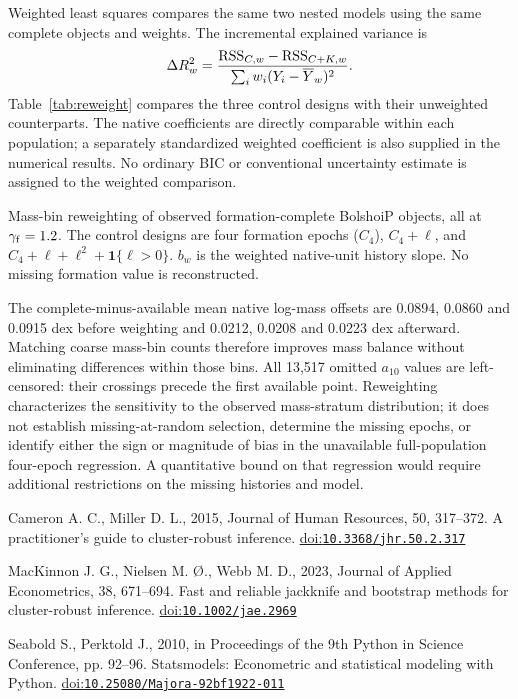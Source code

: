\documentclass[11pt,a4paper]{article}
\newcommand{\doi}[1]{\href{https://doi.org/#1}{doi:\nolinkurl{#1}}}
\begin{document}
Weighted least squares compares the same two nested models using the same complete objects and weights. The incremental explained variance is
\begin{equation}
\Delta R^2_w=\frac{{\rm RSS}_{C,w}-{\rm RSS}_{C+K,w}}{\sum_iw_i(Y_i-\overline Y_w)^2}.
\end{equation}
Table~\ref{tab:reweight} compares the three control designs with their unweighted counterparts. The native coefficients are directly comparable within each population; a separately standardized weighted coefficient is also supplied in the numerical results. No ordinary BIC or conventional uncertainty estimate is assigned to the weighted comparison.
\begin{table}[htbp]\centering\small

\caption{Mass-bin reweighting of observed formation-complete BolshoiP objects, all at $\gamma_{\rm f}=1.2$. The control designs are four formation epochs ($C_4$), $C_4+\ell$, and $C_4+\ell+\ell^2+\mathbf1\{\ell>0\}$. $b_w$ is the weighted native-unit history slope. No missing formation value is reconstructed.}\label{tab:reweight}
\end{table}

The complete-minus-available mean native log-mass offsets are 0.0894, 0.0860 and 0.0915 dex before weighting and 0.0212, 0.0208 and 0.0223 dex afterward. Matching coarse mass-bin counts therefore improves mass balance without eliminating differences within those bins. All 13,517 omitted $a_{10}$ values are left-censored: their crossings precede the first available point. Reweighting characterizes the sensitivity to the observed mass-stratum distribution; it does not establish missing-at-random selection, determine the missing epochs, or identify either the sign or magnitude of bias in the unavailable full-population four-epoch regression. A quantitative bound on that regression would require additional restrictions on the missing histories and model.

{\small
\begin{thebibliography}{9}
Cameron A. C., Miller D. L., 2015, Journal of Human Resources, 50, 317--372. A practitioner's guide to cluster-robust inference. \doi{10.3368/jhr.50.2.317}

MacKinnon J. G., Nielsen M. {\O}., Webb M. D., 2023, Journal of Applied Econometrics, 38, 671--694. Fast and reliable jackknife and bootstrap methods for cluster-robust inference. \doi{10.1002/jae.2969}

Seabold S., Perktold J., 2010, in Proceedings of the 9th Python in Science Conference, pp. 92--96. Statsmodels: Econometric and statistical modeling with Python. \doi{10.25080/Majora-92bf1922-011}

\end{thebibliography}
}
\end{document}
